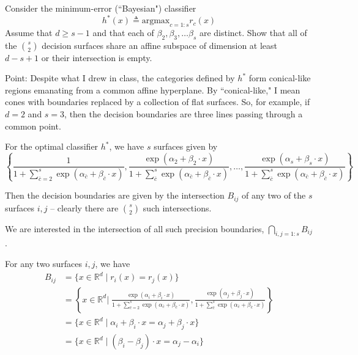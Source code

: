 \documentclass[11pt]{report}
\newcommand{\R}{\mathbb{R}}
\begin{document}
\begin{enumerate}[1.]
\begin{enumerate}[(a)]
		            Consider the minimum-error (``Bayesian") classifier
		            \begin{equation}
			            \label{eqn:Bayes}
			            h^*(x) \triangleq \text{argmax}_{c=1:s} r_c(x)
		            \end{equation}
		            Assume that $d\geq s-1$ and that each of $\beta_2,\beta_3,\ldots\beta_s$ are distinct. Show that all of the $ {s}\choose{2}$ decision surfaces share an affine subspace of dimension at least
		            $d-s + 1$ or their intersection is empty.

		            Point: Despite what I drew in class, the categories defined by $h^*$ form conical-like regions emanating from a common affine hyperplane. By ``conical-like," I mean cones with boundaries replaced by a collection of flat surfaces.  So, for example, if $d=2$ and $s=3$, then the decision boundaries are three lines passing through a common point.


		            \color{blue}
		            For the optimal classifier $h^*$, we have $s$ surfaces given by
		            \[\left\{\frac{1}{1 + \sum_{\bar c =2}^{s} \exp(\alpha_{\bar c} + \beta_{\bar c} \cdot x)}, \frac{\exp(\alpha_2 + \beta_2 \cdot x)}{1 + \sum_{\bar c}^{s} \exp(\alpha_{\bar c} + \beta_{\bar c} \cdot x)}, \dots,\frac{\exp(\alpha_s + \beta_s \cdot x)}{1 + \sum_{\bar c}^{s} \exp(\alpha_{\bar c} + \beta_{\bar c} \cdot x)} \right\}\]

		            Then the decision boundaries are given by the intersection $B_{ij}$ of any two of the $s$ surfaces $i, j$ -- clearly there are $\binom{s}{2}$ such intersections.

		            We are interested in the intersection of all such precision boundaries, $\bigcap_{i, j=1:s} B_{ij}$.

		            For any two surfaces $i,j$, we have
		            \begin{align*}
			            B_{ij} & = \{x \in \R^d \; | \; r_i(x) = r_j(x)\}                                                                                                                                                                                                                                \\
			                   & =\left\{x \in \R^d \big\vert \; \frac{\exp(\alpha_i + \beta_i \cdot x)}{1 + \sum_{\bar c =2}^{s} \exp(\alpha_{\bar c} + \beta_{\bar c} \cdot x)}, \frac{\exp(\alpha_j + \beta_j \cdot x)}{1 + \sum_{\bar c}^{s} \exp(\alpha_{\bar c} + \beta_{\bar c} \cdot x)}\right\} \\
			                   & = \{x \in \R^d \; | \; \alpha_i + \beta_i \cdot x = \alpha_j + \beta_j \cdot x\}                                                                                                                                                                                        \\
			                   & = \{x \in \R^d \; | \; (\beta_i - \beta_j) \cdot x = \alpha_j - \alpha_i\}
		            \end{align*}


\end{enumerate}
\end{enumerate}
\end{document}
